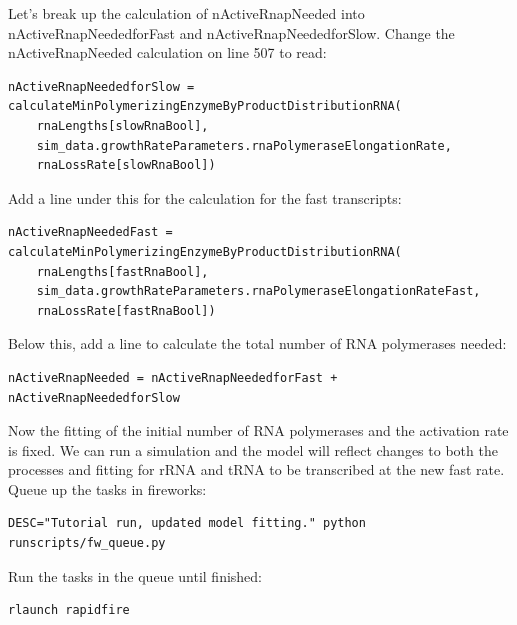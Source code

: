 \documentclass[12pt]{article}
\begin{document}
Let’s break up the calculation of nActiveRnapNeeded into nActiveRnapNeededforFast and nActiveRnapNeededforSlow. Change the nActiveRnapNeeded calculation on line 507 to read:

\begin{lstlisting}
nActiveRnapNeededforSlow = calculateMinPolymerizingEnzymeByProductDistributionRNA(
    rnaLengths[slowRnaBool], 
    sim_data.growthRateParameters.rnaPolymeraseElongationRate, 
    rnaLossRate[slowRnaBool])
\end{lstlisting}

Add a line under this for the calculation for the fast transcripts:

\begin{lstlisting}
nActiveRnapNeededFast = calculateMinPolymerizingEnzymeByProductDistributionRNA(
    rnaLengths[fastRnaBool], 
    sim_data.growthRateParameters.rnaPolymeraseElongationRateFast, 
    rnaLossRate[fastRnaBool])
\end{lstlisting}

Below this, add a line to calculate the total number of RNA polymerases needed:

\begin{lstlisting}
nActiveRnapNeeded = nActiveRnapNeededforFast + nActiveRnapNeededforSlow
\end{lstlisting}

Now the fitting of the initial number of RNA polymerases and the activation rate is fixed. We can run a simulation and the model will reflect changes to both the processes and fitting for rRNA and tRNA to be transcribed at the new fast rate. Queue up the tasks in fireworks:

\lstset{language=bash}
\begin{lstlisting}
DESC="Tutorial run, updated model fitting." python runscripts/fw_queue.py
\end{lstlisting}

Run the tasks in the queue until finished:

\begin{lstlisting}
rlaunch rapidfire
\end{lstlisting}
\end{document}
